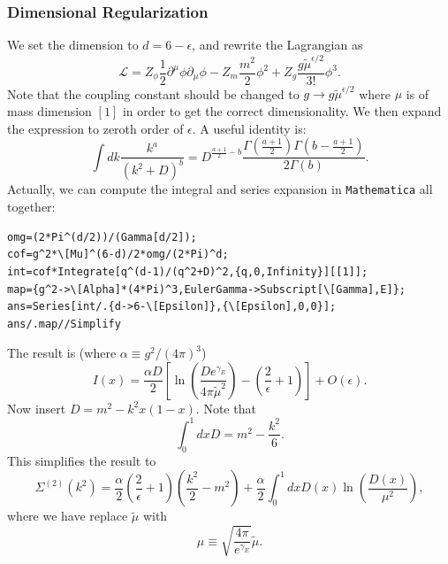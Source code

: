 \subsubsection*{Dimensional Regularization}
We set the dimension to $d=6-\epsilon$, and rewrite the Lagrangian as
\begin{equation}
	\mathcal L 
	= Z_{\phi}\frac{1}{2} \partial^\mu\phi\partial_\mu\phi - 
	Z_m \frac{m^2}{2}\phi^2 + Z_g\frac{g\tilde{\mu}^{\epsilon/2}}{3!}\phi^3.
\end{equation}
Note that the coupling constant should be changed to $g\rightarrow g\tilde\mu^{\epsilon/2}$ where $\mu$ is of mass dimension $[1]$ in order to get the correct dimensionality. 
We then expand the expression to zeroth order of $\epsilon$.
A useful identity is:
\begin{equation}
\int d k \frac{k^{a}}{\left(k^{2}+D\right)^{b}}
= D^{\frac{a+1}{2}-b} 
\frac{\Gamma\left(\frac{a+1}{2}\right)\Gamma\left(b-\frac{a+1}{2}\right)}{2\Gamma(b)}.
\end{equation}
Actually, we can compute the integral and series expansion in \texttt{Mathematica} all together:
\begin{lstlisting}[style=mathematicaFrameTB]
omg=(2*Pi^(d/2))/(Gamma[d/2]);
cof=g^2*\[Mu]^(6-d)/2*omg/(2*Pi)^d;
int=cof*Integrate[q^(d-1)/(q^2+D)^2,{q,0,Infinity}][[1]];
map={g^2->\[Alpha]*(4*Pi)^3,EulerGamma->Subscript[\[Gamma],E]};
ans=Series[int/.{d->6-\[Epsilon]},{\[Epsilon],0,0}];
ans/.map//Simplify
\end{lstlisting}
The result is (where $\alpha\equiv g^2/(4\pi)^3$)
\begin{equation*}
I(x)= \frac{\alpha D}{2} \left[
\ln \left(\frac{De^{\gamma_E}}{4\pi\tilde\mu^2}\right)-\left(\frac{2}{\epsilon}+1\right)
\right]+O(\epsilon).
\end{equation*}
Now insert $D=m^2-k^{2} x(1-x)$. Note that
\begin{equation*}
\int_0^1 dx D = m^2-\frac{k^2}{6}.
\end{equation*}
This simplifies the result to
\begin{equation}
	\Sigma^{(2)}(k^2) = \frac{\alpha}{2}\left(\frac{2}{\epsilon}+1\right)\left(\frac{k^2}{2}-m^2\right)
	+ \frac{\alpha}{2}\int_0^1 dx D(x)\ln\left(\frac{D(x)}{\mu^2}\right),
\end{equation}
where we have replace $\tilde\mu$ with
\begin{equation}
\mu \equiv \sqrt{\frac{4\pi}{e^{\gamma_E}}}\tilde\mu.
\end{equation}



